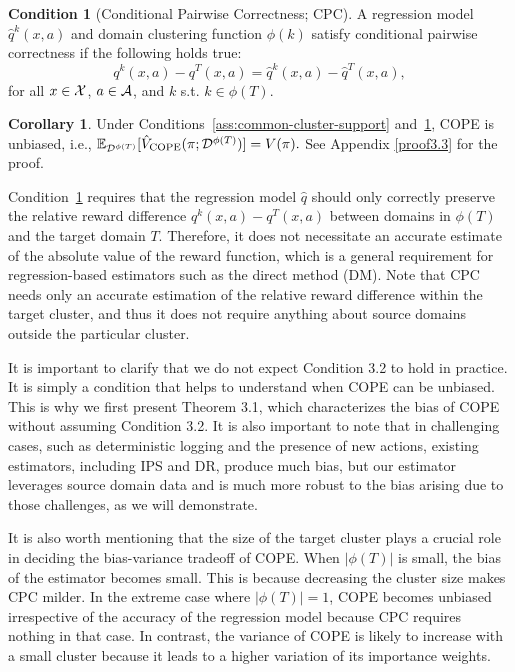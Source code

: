 \documentclass{article} %
\theoremstyle{definition}
\newtheorem{assum}{Condition}[section]
\newtheorem{corr}{Corollary}[section]
\begin{document}
\begin{assum}[Conditional Pairwise Correctness; CPC]
\label{ass:cpc}
A regression model $\hat{q}^k(x,a)$ and domain clustering function $\phi(k)$ satisfy conditional pairwise correctness if the following holds true:
    $$q^k(x,a) - q^T(x,a)  = \hat{q}^k(x,a) - \hat{q}^T(x,a),$$
for all $x \in \mathcal{X}$, $a \in \mathcal{A}$, and $k$ s.t. $k \in \phi(T)$.
\end{assum}


\begin{corr}
\label{prop3.3}
Under Conditions~\ref{ass:common-cluster-support} and~\ref{ass:cpc}, COPE is unbiased, i.e., $\mathbb{E}_{\mathcal{D}^{\phi(T)}}[\hat{V}_{\rm{COPE}}(\pi;\mathcal{D}^{\phi(T)})] = V(\pi).$ See Appendix \ref{proof3.3} for the proof.
\end{corr}

Condition~\ref{ass:cpc} requires that the regression model $\hat{q}$ should only correctly preserve the relative reward difference $q^k(x,a) - q^T(x,a)$ between domains in $\phi(T)$ and the target domain $T$. Therefore, it does not necessitate an accurate estimate of the absolute value of the reward function, which is a general requirement for regression-based estimators such as the direct method (DM). Note that CPC needs only an accurate estimation of the relative reward difference within the target cluster, and thus it does not require anything about source domains outside the particular cluster.

It is important to clarify that we do not expect Condition 3.2 to hold in practice. It is simply a condition that helps to understand when COPE can be unbiased. This is why we first present Theorem 3.1, which characterizes the bias of COPE without assuming Condition 3.2. It is also important to note that in challenging cases, such as deterministic logging and the presence of new actions, existing estimators, including IPS and DR, produce much bias, but our estimator leverages source domain data and is much more robust to the bias arising due to those challenges, as we will demonstrate.

It is also worth mentioning that the size of the target cluster plays a crucial role in deciding the bias-variance tradeoff of COPE. When $|\phi(T)|$ is small, the bias of the estimator becomes small. This is because decreasing the cluster size makes CPC milder. In the extreme case where $|\phi(T)| = 1$, COPE becomes unbiased irrespective of the accuracy of the regression model because CPC requires nothing in that case. In contrast, the variance of COPE is likely to increase with a small cluster because it leads to a higher variation of its importance weights.
\end{document}
